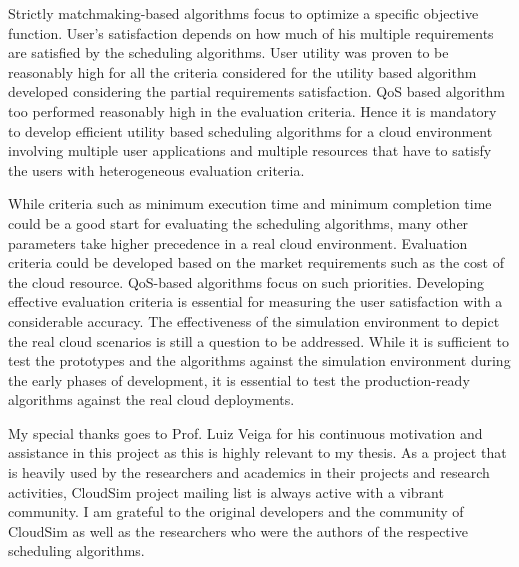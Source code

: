 \documentclass[times, 10pt,twocolumn]{article}
\begin{document}
Strictly matchmaking-based algorithms focus to optimize a specific objective function. User's satisfaction depends on how much of his multiple requirements are satisfied by the scheduling algorithms. User utility was proven to be reasonably high for all the criteria considered for the utility based algorithm developed considering the partial requirements satisfaction. QoS based algorithm too performed reasonably high in the evaluation criteria. Hence it is mandatory to develop efficient utility based scheduling algorithms for a cloud environment involving multiple user applications and multiple resources that have to satisfy the users with heterogeneous evaluation criteria.

While criteria such as minimum execution time and minimum completion time could be a good start for evaluating the scheduling algorithms, many other parameters take higher precedence in a real cloud environment. Evaluation criteria could be developed based on the market requirements such as the cost of the cloud resource. QoS-based algorithms focus on such priorities. Developing effective evaluation criteria is essential for measuring the user satisfaction with a considerable accuracy. The effectiveness of the simulation environment to depict the real cloud scenarios is still a question to be addressed. While it is sufficient to test the prototypes and the algorithms against the simulation environment during the early phases of development, it is essential to test the production-ready algorithms against the real cloud deployments.

My special thanks goes to Prof. Luiz Veiga for his continuous motivation and assistance in this project as this is highly relevant to my thesis. As a project that is heavily used by the researchers and academics in their projects and research activities, CloudSim project mailing list is always active with a vibrant community. I am grateful to the original developers and the community of CloudSim as well as the researchers who were the authors of the respective scheduling algorithms.



\nocite{ex1,ex2}


\end{document}
